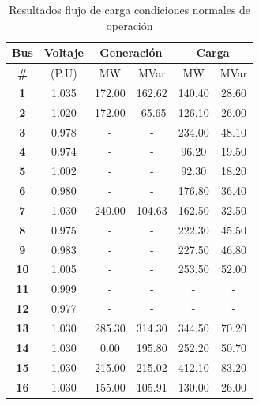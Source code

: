 \documentclass{article}
\begin{document}
\begin{table}[H]
\centering
\caption{Resultados flujo de carga condiciones normales de operación}
\label{CondicionesNormales}
\begin{tabular}{|c|c|c|c|c|c|}
\hline
\textbf{Bus} & Voltaje & \multicolumn{2}{c|}{Generación} & \multicolumn{2}{c|}{Carga} \\ \hline
\textbf{\#}  & (P.U)   & MW              & MVar          & MW           & MVar        \\ \hline
\textbf{1}   & 1.035   & 172.00          & 162.62        & 140.40       & 28.60       \\ \hline
\textbf{2}   & 1.020   & 172.00          & -65.65        & 126.10       & 26.00       \\ \hline
\textbf{3}   & 0.978   & -               & -             & 234.00       & 48.10       \\ \hline
\textbf{4}   & 0.974   & -               & -             & 96.20        & 19.50       \\ \hline
\textbf{5}   & 1.002   & -               & -             & 92.30        & 18.20       \\ \hline
\textbf{6}   & 0.980   & -               & -             & 176.80       & 36.40       \\ \hline
\textbf{7}   & 1.030   & 240.00          & 104.63        & 162.50       & 32.50       \\ \hline
\textbf{8}   & 0.975   & -               & -             & 222.30       & 45.50       \\ \hline
\textbf{9}   & 0.983   & -               & -             & 227.50       & 46.80       \\ \hline
\textbf{10}  & 1.005   & -               & -             & 253.50       & 52.00       \\ \hline
\textbf{11}  & 0.999   & -               & -             & -            & -           \\ \hline
\textbf{12}  & 0.977   & -               & -             & -            & -           \\ \hline
\textbf{13}  & 1.030   & 285.30          & 314.30        & 344.50       & 70.20       \\ \hline
\textbf{14}  & 1.030   & 0.00            & 195.80        & 252.20       & 50.70       \\ \hline
\textbf{15}  & 1.030   & 215.00          & 215.02        & 412.10       & 83.20       \\ \hline
\textbf{16}  & 1.030   & 155.00          & 105.91        & 130.00       & 26.00       \\ \hline

\end{tabular}
\end{table}
\end{document}
